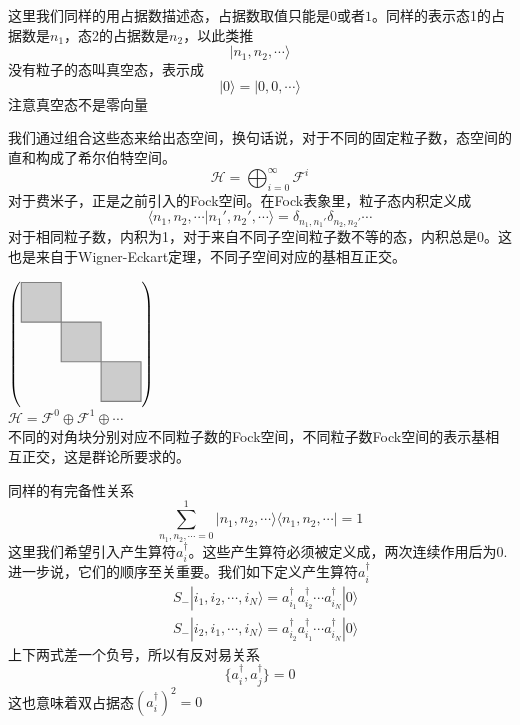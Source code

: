 \documentclass[12pt]{article}
\begin{document}
这里我们同样的用占据数描述态，占据数取值只能是$0$或者$1$。同样的表示态1的占据数是$n_1$，态2的占据数是$n_2$，以此类推
\begin{equation*}
    |n_1,n_2,\cdots\rangle
\end{equation*}
没有粒子的态叫真空态，表示成
\begin{equation*}
    |0\rangle=|0,0,\cdots\rangle
\end{equation*}
注意真空态不是零向量

我们通过组合这些态来给出态空间，换句话说，对于不同的固定粒子数，态空间的直和构成了希尔伯特空间。
\begin{equation*}
    \mathcal{H}=\bigoplus_{i=0}^{\infty}\mathcal{F}^i
\end{equation*}
对于费米子，正是之前引入的Fock空间。在Fock表象里，粒子态内积定义成
\begin{equation*}
    \langle n_1,n_2,\cdots|n_1',n_2',\cdots\rangle=\delta_{n_1,n_1'}\delta_{n_2,n_2'}\cdots
\end{equation*}
对于相同粒子数，内积为1，对于来自不同子空间粒子数不等的态，内积总是0。这也是来自于Wigner-Eckart定理，不同子空间对应的基相互正交。
\begin{center}
$\begin{pmatrix}\begin{tikzpicture}
    [inner sep=5mm,
    place/.style={circle,draw=blue!50,fill=blue!20,thick},
    transition/.style={rectangle,draw=black!50,fill=black!20,thick}]
    \node at ( -2,2) [transition] {};
    \node at ( -1,1) [transition] {};
    \node at ( 0,0) [transition] {};
\end{tikzpicture}\end{pmatrix}$\\
\footnotesize{$\mathcal{H}=\mathcal{F}^0\oplus\mathcal{F}^1\oplus\cdots$\\不同的对角块分别对应不同粒子数的Fock空间，不同粒子数Fock空间的表示基相互正交，这是群论所要求的。}
\end{center}
同样的有完备性关系
\begin{equation*}
    \sum_{n_1,n_2,\cdots=0}^{1}|n_1,n_2,\cdots\rangle\langle n_1,n_2,\cdots|=1
\end{equation*}
这里我们希望引入产生算符$a_i^\dagger$。这些产生算符必须被定义成，两次连续作用后为0.进一步说，它们的顺序至关重要。我们如下定义产生算符$a_i^\dagger$
\begin{equation*}
    \begin{split}
        &S_-|i_1,i_2,\cdots,i_N\rangle=a_{i_1}^\dagger a_{i_2}^\dagger\cdots a_{i_N}^\dagger|0\rangle\\
        &S_-|i_2,i_1,\cdots,i_N\rangle=a_{i_2}^\dagger a_{i_1}^\dagger\cdots a_{i_N}^\dagger|0\rangle
    \end{split}
\end{equation*}
上下两式差一个负号，所以有反对易关系
\begin{equation*}
    \{a_i^\dagger,a_j^\dagger\}=0
\end{equation*}
这也意味着双占据态$(a_i^\dagger)^2=0$
\end{document}
